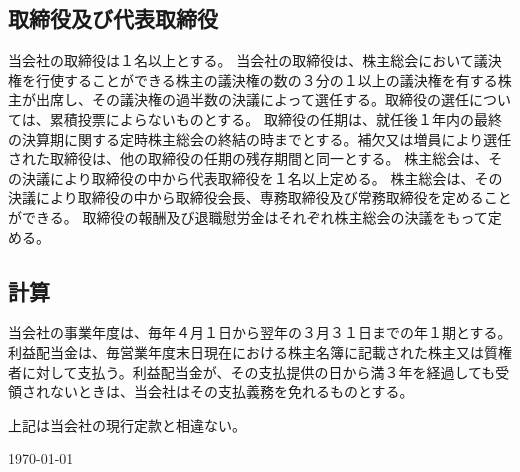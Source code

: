 \documentclass[10pt,a4paper,uplatex]{jsarticle}
\begin{document}
\subsection{取締役及び代表取締役}
当会社の取締役は１名以上とする。
当会社の取締役は、株主総会において議決権を行使することができる株主の議決権の数の３分の１以上の議決権を有する株主が出席し、その議決権の過半数の決議によって選任する。取締役の選任については、累積投票によらないものとする。
取締役の任期は、就任後１年内の最終の決算期に関する定時株主総会の終結の時までとする。補欠又は増員により選任された取締役は、他の取締役の任期の残存期間と同一とする。
株主総会は、その決議により取締役の中から代表取締役を１名以上定める。
\term 株主総会は、その決議により取締役の中から取締役会長、専務取締役及び常務取締役を定めることができる。
取締役の報酬及び退職慰労金はそれぞれ株主総会の決議をもって定める。


\subsection{計算}
当会社の事業年度は、毎年４月１日から翌年の３月３１日までの年１期とする。
利益配当金は、毎営業年度末日現在における株主名簿に記載された株主又は質権者に対して支払う。利益配当金が、その支払提供の日から満３年を経過しても受領されないときは、当会社はその支払義務を免れるものとする。


\vspace{20pt}
上記は当会社の現行定款と相違ない。
\begin{flushleft} 
\today\\
\vspace{10pt}
\MakeSignatureField
\end{flushleft}
\end{document}
